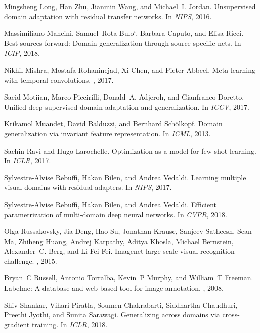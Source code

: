 \documentclass[10pt,twocolumn,letterpaper]{article}
\begin{document}
{\begin{thebibliography}{10}
Mingsheng Long, Han Zhu, Jianmin Wang, and Michael~I. Jordan.
\newblock Unsupervised domain adaptation with residual transfer networks.
\newblock In {\em NIPS}, 2016.

Massimiliano Mancini, Samuel~Rota Bulo`, Barbara Caputo, and Elisa Ricci.
\newblock Best sources forward: Domain generalization through source-specific
  nets.
\newblock In {\em ICIP}, 2018.

Nikhil Mishra, Mostafa Rohaninejad, Xi Chen, and Pieter Abbeel.
\newblock Meta-learning with temporal convolutions.
, 2017.

Saeid Motiian, Marco Piccirilli, Donald~A. Adjeroh, and Gianfranco Doretto.
\newblock Unified deep supervised domain adaptation and generalization.
\newblock In {\em ICCV}, 2017.

Krikamol Muandet, David Balduzzi, and Bernhard Sch{\"o}lkopf.
\newblock Domain generalization via invariant feature representation.
\newblock In {\em ICML}, 2013.

Sachin Ravi and Hugo Larochelle.
\newblock Optimization as a model for few-shot learning.
\newblock In {\em ICLR}, 2017.

Sylvestre-Alvise Rebuffi, Hakan Bilen, and Andrea Vedaldi.
\newblock Learning multiple visual domains with residual adapters.
\newblock In {\em NIPS}, 2017.

Sylvestre-Alvise Rebuffi, Hakan Bilen, and Andrea Vedaldi.
\newblock Efficient parametrization of multi-domain deep neural networks.
\newblock In {\em CVPR}, 2018.

Olga Russakovsky, Jia Deng, Hao Su, Jonathan Krause, Sanjeev Satheesh, Sean Ma,
  Zhiheng Huang, Andrej Karpathy, Aditya Khosla, Michael Bernstein,
  Alexander~C. Berg, and Li Fei-Fei.
\newblock Imagenet large scale visual recognition challenge.
, 2015.

Bryan~C Russell, Antonio Torralba, Kevin~P Murphy, and William~T Freeman.
\newblock Labelme: A database and web-based tool for image annotation.
, 2008.

Shiv Shankar, Vihari Piratla, Soumen Chakrabarti, Siddhartha Chaudhuri, Preethi
  Jyothi, and Sunita Sarawagi.
\newblock Generalizing across domains via cross-gradient training.
\newblock In {\em ICLR}, 2018.


\end{thebibliography}}
\end{document}

